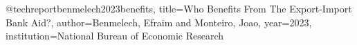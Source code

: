 @techreport{benmelech2023benefits,
  title={Who Benefits From The Export-Import Bank Aid?},
  author={Benmelech, Efraim and Monteiro, Joao},
  year={2023},
  institution={National Bureau of Economic Research}
}